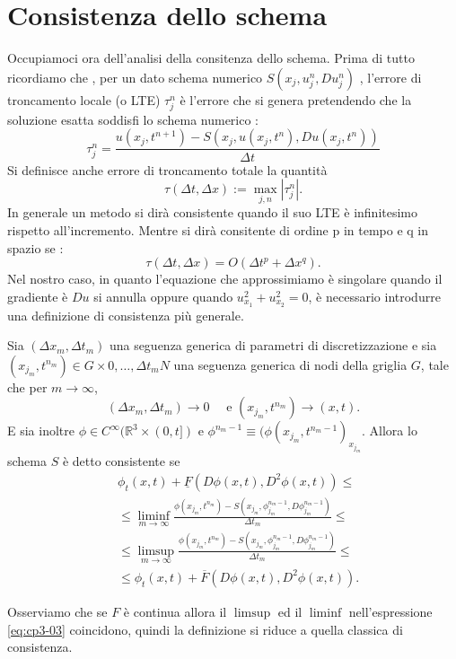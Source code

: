 \section{Consistenza dello schema}
Occupiamoci ora dell'analisi della consitenza dello schema. Prima di tutto ricordiamo che , per un dato schema numerico $S(x_j,u_j^n,Du_j^n)$ , l'errore di troncamento locale (o LTE) $\tau_j^n$ è l'errore che si genera pretendendo che la soluzione esatta soddisfi lo schema numerico :
\[
\tau_j^n=\frac{u(x_j,t^{n+1})-S(x_j,u(x_j,t^n),Du(x_j,t^n))}{\Delta t}
\]
Si definisce anche errore di troncamento totale la quantità
\[
\tau(\Delta t,\Delta x) := \max_{j,n} |\tau_j^n|.
\]
In generale un metodo si dirà consistente quando il suo LTE è infinitesimo rispetto all'incremento. Mentre si dirà consitente di ordine p in tempo e q in spazio se :
\[
\tau(\Delta t,\Delta x) = O(\Delta t^p +\Delta x^q).
\] 
Nel nostro caso, in quanto l'equazione che approssimiamo è singolare quando il gradiente è $Du$ si annulla oppure quando $u_{x_1}^2+u_{x_2}^2=0$, è necessario introdurre una definizione di consistenza più generale.
\begin{definizione}
Sia $(\Delta x_m,\Delta t_m)$ una seguenza generica di parametri di discretizzazione e sia $(x_{j_m},t^{n_m})\in G\times{0,\dots,\Delta t_mN}$ una seguenza generica di nodi della griglia $G$, tale che per $m\to\infty$,
\[
(\Delta x_m,\Delta t_m)\to0 \quad\text{ e } (x_{j_m},t^{n_m})\to(x,t).
\]
E sia inoltre $\phi\in C^{\infty}(\mathbb{R}^3\times(0,t])$ e $\phi^{n_m-1}\equiv(\phi(x_{j_m},t^{n_m-1})_{x_{j_m}}$. Allora lo schema $S$ è detto consistente se
\begin{equation}
\label{eq:cp3-03}
\begin{split}
&\phi_t(x,t)+\underline{F}(D\phi(x,t),D^2\phi(x,t))\le \\
&\le\liminf_{m\to\infty}\frac{\phi(x_{j_m},t^{n_m})-S(x_{j_m},\phi_{j_m}^{n_m-1},D\phi_{j_m}^{n_m-1})}{\Delta t_m}\le \\
&\le\limsup_{m\to\infty}\frac{\phi(x_{j_m},t^{n_m})-S(x_{j_m},\phi_{j_m}^{n_m-1},D\phi_{j_m}^{n_m-1})}{\Delta t_m}\le \\
&\le\phi_t(x,t)+\overline{F}(D\phi(x,t),D^2\phi(x,t)).
\end{split}
\end{equation}
\end{definizione}
\begin{osservazione}
Osserviamo che se $F$ è continua allora il $\limsup$ ed il $\liminf$ nell'espressione \eqref{eq:cp3-03} coincidono, quindi la definizione si riduce a quella classica di consistenza.
\end{osservazione}

